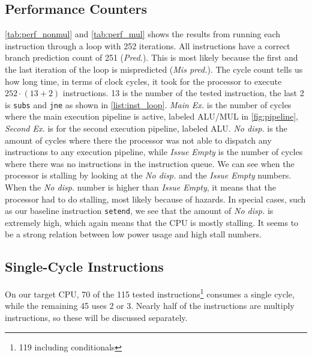 \subsection{Performance Counters}
\autoref{tab:perf_nonmul} and \autoref{tab:perf_mul} shows the results from
running each instruction through a loop with 252 iterations. All instructions
have a  correct branch prediction count of 251 (\emph{Pred.}). This is most
likely because the first and the last iteration of the loop is mispredicted
(\emph{Mis pred.}). The cycle count tells us how long time, in terms of clock
cycles, it took for the processor to execute $252 \cdot (13+2)$ instructions. 13
is the number of the tested instruction, the last 2 is \texttt{subs} and
\texttt{jne} as shown in \autoref{list:inst_loop}. \emph{Main Ex.} is the number of
cycles where the main execution pipeline is active, labeled ALU/MUL in
\autoref{fig:pipeline}, \emph{Second Ex.} is for the second execution pipeline, labeled
ALU. \emph{No disp.} is the amount of cycles where there the processor was not
able to dispatch any instructions to any execution pipeline, while \emph{Issue
Empty} is the number of cycles where there was no instructions in the
instruction queue. We can see when the processor is stalling by looking at the
\emph{No disp.} and the \emph{Issue Empty} numbers. When the \emph{No disp.} number is
higher than \emph{Issue Empty}, it means that the processor had to do stalling, most
likely because of hazards. In special cases, such as our baseline instruction
\texttt{setend}, we see that the amount of \emph{No disp.} is extremely high,
which again means that the CPU is mostly stalling. It seems to be a strong
relation between low power usage and high stall numbers.


\subsection{Single-Cycle Instructions}
On our target CPU, 70 of the 115 tested instructions\footnote{119 including
conditionals} consumes a single cycle, while the remaining 45 uses 2 or 3.
Nearly half of the instructions are multiply instructions, so these will be
discussed separately.

